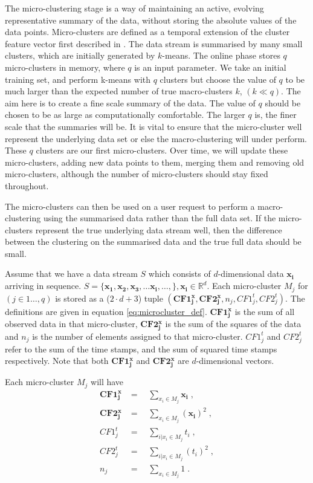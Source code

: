 The micro-clustering stage is a way of maintaining an active, evolving representative summary of the data, without storing the absolute values of the data points. Micro-clusters are defined as a temporal extension of the cluster feature vector first described in \cite{Zhang1996a}. The data stream is summarised by many small clusters, which are initially generated by $k$-means. The online phase stores $q$ micro-clusters in memory, where $q$ is an input parameter.
We take an initial training set, and perform k-means with $q$ clusters but choose the value of $q$ to be much larger than the expected number of true macro-clusters $k$, $(k \ll q)$. The aim here is to create a fine scale summary of the data. The value of $q$ should be chosen to be as large as computationally comfortable. The larger $q$ is, the finer scale that the summaries will be. It is vital to ensure that the micro-cluster well represent the underlying data set or else the macro-clustering will under perform. These $q$ clusters are our first micro-clusters. Over time, we will update these micro-clusters, adding new data points to them, merging them and removing old micro-clusters, although the number of micro-clusters should stay fixed throughout. 

The micro-clusters can then be used on a user request to perform a macro-clustering using the summarised data rather than the full data set. If the micro-clusters represent the true underlying data stream well, then the difference between the clustering on the summarised data and the true full data should be small. 

Assume that we have a data stream $S$ which consists of $d$-dimensional data $\boldsymbol{x_i}$ arriving in sequence. $S = \{\boldsymbol{ x_1}, \boldsymbol{x_2}, \boldsymbol{x_3}, \hdots \boldsymbol{x_i}, \hdots, \}, \boldsymbol{x_i} \in \mathbb{R}^d$. Each micro-cluster $M_j$ for $(j \in 1 \ldots, q)$ is stored as a ($2 \cdot d + 3$) tuple $(\boldsymbol{CF1^x_j}, \boldsymbol{CF2^x_j}, n_j, CF1^t_j, CF2^t_j)$. The definitions are given in equation \eqref{eq:microcluster_def}. $\boldsymbol{CF1^x_j}$ is the sum of all observed data in that micro-cluster, $\boldsymbol{CF2^x_j}$ is the sum of the squares of the data and $n_j$ is the number of elements assigned to that micro-cluster. $CF1^t_j$ and $CF2^t_j$ refer to the sum of the time stamps, and the sum of squared time stamps respectively. Note that both $\boldsymbol{CF1^x_j}$ and $\boldsymbol{CF2^x_j}$ are $d$-dimensional vectors.

Each micro-cluster $M_j$ will have 
\begin{align}
\boldsymbol{CF1^x_j} &= \quad \sum_{x_i \in M_j}{\boldsymbol{x_i}} \; , \nonumber  \\ 
\boldsymbol{CF2^x_j} &= \quad \sum_{x_i \in M_j}{(\boldsymbol{x_i})^2} \; , \nonumber\\
CF1^t_j &= \quad \sum_{i | x_i \in M_j}{t_i} \; , \nonumber   \\
CF2^t_j &= \quad\sum_{i | x_i \in M_j}{(t_i)^2} \; , \nonumber\\
n_j &= \quad \sum_{x_i \in M_j}{1} \; .
\label{eq:microcluster_def}
\end{align}

